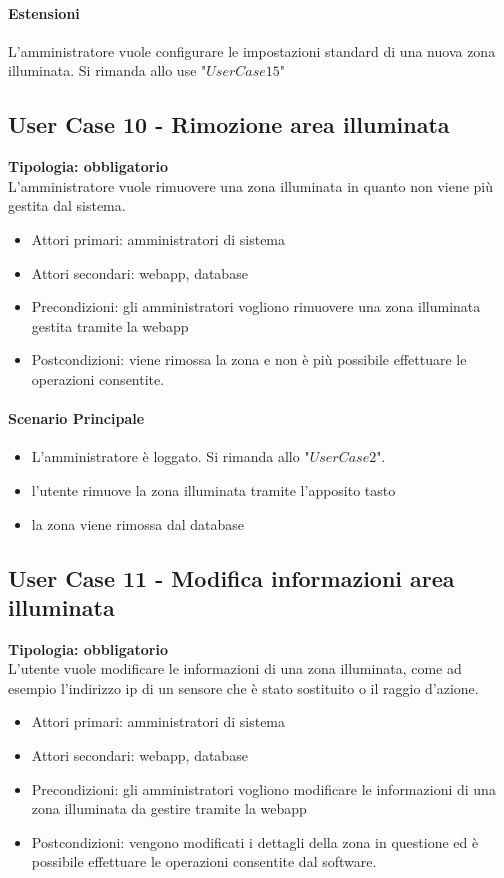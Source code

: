 \documentclass[12pt]{article}
\begin{document}
\paragraph{Estensioni} L'amministratore vuole configurare le impostazioni standard di una nuova zona illuminata. Si rimanda allo use "$User Case 15$"

\subsection{User Case 10 - Rimozione area illuminata}
\textbf{Tipologia: obbligatorio} \\
L'amministratore vuole rimuovere una zona illuminata in quanto non viene più gestita dal sistema.
\begin{itemize}
	\item Attori primari: amministratori di sistema
	\item Attori secondari: webapp, database
	\item Precondizioni: gli amministratori vogliono rimuovere una zona illuminata gestita tramite la webapp
	\item Postcondizioni: viene rimossa la zona e non è più possibile effettuare le operazioni consentite.
\end{itemize}
\paragraph{Scenario Principale}
\begin{itemize}
	\item L'amministratore è loggato. Si rimanda allo "$User Case 2$".
	\item l'utente rimuove la zona illuminata tramite l'apposito tasto
	\item la zona viene rimossa dal database 
\end{itemize}

\subsection{User Case 11 - Modifica informazioni area illuminata}
\textbf{Tipologia: obbligatorio} \\
L'utente vuole modificare le informazioni di una zona illuminata, come ad esempio l'indirizzo ip di un sensore che è stato sostituito o il raggio d'azione.
\begin{itemize}
	\item Attori primari: amministratori di sistema
	\item Attori secondari: webapp, database
	\item Precondizioni: gli amministratori vogliono modificare le informazioni di una  zona illuminata da gestire tramite la webapp
	\item Postcondizioni: vengono modificati i dettagli della zona in questione ed è possibile effettuare le operazioni consentite dal software.
\end{itemize}
\end{document}
